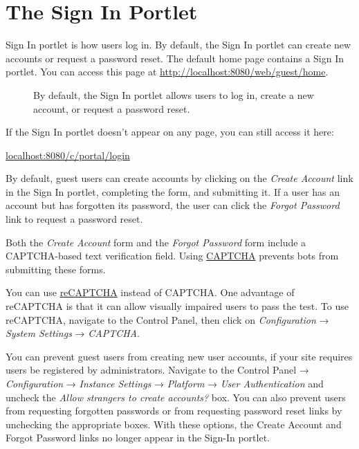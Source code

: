 \section{The Sign In Portlet}\label{the-sign-in-portlet}

Sign In portlet is how users log in. By default, the Sign In portlet can
create new accounts or request a password reset. The default home page
contains a Sign In portlet. You can access this page at
\url{http://localhost:8080/web/guest/home}.

\begin{figure}
\centering
{}
\caption{By default, the Sign In portlet allows users to log in, create
a new account, or request a password reset.}
\end{figure}

If the Sign In portlet doesn't appear on any page, you can still access
it here:

\url{localhost:8080/c/portal/login}

By default, guest users can create accounts by clicking on the
\emph{Create Account} link in the Sign In portlet, completing the form,
and submitting it. If a user has an account but has forgotten its
password, the user can click the \emph{Forgot Password} link to request
a password reset.

Both the \emph{Create Account} form and the \emph{Forgot Password} form
include a CAPTCHA-based text verification field. Using
\href{http://www.captcha.net}{CAPTCHA} prevents bots from submitting
these forms.

You can use
\href{https://www.google.com/recaptcha/intro/index.html}{reCAPTCHA}
instead of CAPTCHA. One advantage of reCAPTCHA is that it can allow
visually impaired users to pass the test. To use reCAPTCHA, navigate to
the Control Panel, then click on \emph{Configuration} → \emph{System
Settings} → \emph{CAPTCHA}.

You can prevent guest users from creating new user accounts, if your
site requires users be registered by administrators. Navigate to the
Control Panel → \emph{Configuration} → \emph{Instance Settings} →
\emph{Platform} → \emph{User Authentication} and uncheck the \emph{Allow
strangers to create accounts?} box. You can also prevent users from
requesting forgotten passwords or from requesting password reset links
by unchecking the appropriate boxes. With these options, the Create
Account and Forgot Password links no longer appear in the Sign-In
portlet.

